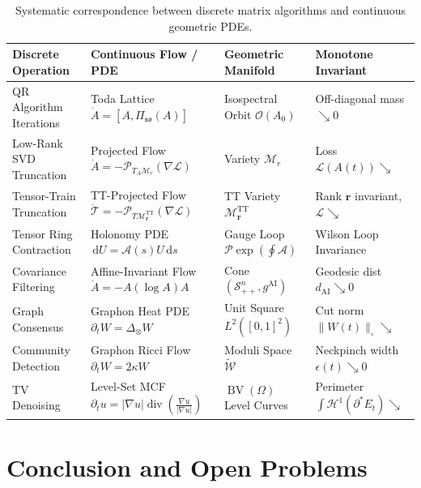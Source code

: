 \documentclass[11pt,a4paper,reqno]{amsart}
\theoremstyle{definition}
\numberwithin{equation}{section}
\providecommand{\BV}{\operatorname{BV}}
\providecommand{\cutnorm}[1]{\|#1\|_{\square}}
\newcommand{\dif}{\,\mathrm{d}}
\providecommand{\BV}{\mathrm{BV}}
\providecommand{\cutnorm}[1]{\|#1\|_{\square}}
\begin{document}
\begin{table}[htbp]
\centering
\scriptsize
\renewcommand{\arraystretch}{1.3}
\begin{tabularx}{\textwidth}{@{}lXlX@{}}
\toprule
\textbf{Discrete Operation} & \textbf{Continuous Flow / PDE} & \textbf{Geometric Manifold} & \textbf{Monotone Invariant} \\
\midrule
QR Algorithm Iterations & Toda Lattice $\dot{A} = [A, \Pi_{\mathfrak{so}}(A)]$ & Isospectral Orbit $\mathcal{O}(A_0)$ & Off-diagonal mass $\searrow 0$ \\
Low-Rank SVD Truncation & Projected Flow $\dot{A} = -\mathcal{P}_{T_A \mathcal{M}_r}(\nabla \mathcal{L})$ & Variety $\mathcal{M}_r$ & Loss $\mathcal{L}(A(t)) \searrow$ \\
Tensor-Train Truncation & TT-Projected Flow $\dot{\mathcal{T}} = -\mathcal{P}_{T \mathcal{M}_{\mathbf{r}}^{\mathrm{TT}}}(\nabla \mathcal{L})$ & TT Variety $\mathcal{M}_{\mathbf{r}}^{\mathrm{TT}}$ & Rank $\mathbf{r}$ invariant, $\mathcal{L} \searrow$ \\
Tensor Ring Contraction & Holonomy PDE $\dif U = \mathcal{A}(s) U \dif s$ & Gauge Loop $\mathcal{P} \exp(\oint \mathcal{A})$ & Wilson Loop Invariance \\
Covariance Filtering & Affine-Invariant Flow $\dot{A} = -A (\log A) A$ & Cone $(\mathcal{S}_{++}^n, g^{\mathrm{AI}})$ & Geodesic dist $d_{\mathrm{AI}} \searrow 0$ \\
Graph Consensus & Graphon Heat PDE $\partial_t W = \Delta_\otimes W$ & Unit Square $L^2([0,1]^2)$ & Cut norm $\cutnorm{W(t)} \searrow$ \\
Community Detection & Graphon Ricci Flow $\partial_t W = 2\kappa W$ & Moduli Space $\widetilde{\mathcal{W}}$ & Neckpinch width $\epsilon(t) \searrow 0$ \\
TV Denoising & Level-Set MCF $\partial_t u = |\nabla u| \operatorname{div}(\frac{\nabla u}{|\nabla u|})$ & $\BV(\Omega)$ Level Curves & Perimeter $\int \mathcal{H}^1(\partial^* E_t) \searrow$ \\
\bottomrule
\end{tabularx}
\caption{Systematic correspondence between discrete matrix algorithms and continuous geometric PDEs.}
\label{tab:flows_comparison}
\end{table}

\section{Conclusion and Open Problems}
\label{sec:conclusion}
\end{document}
